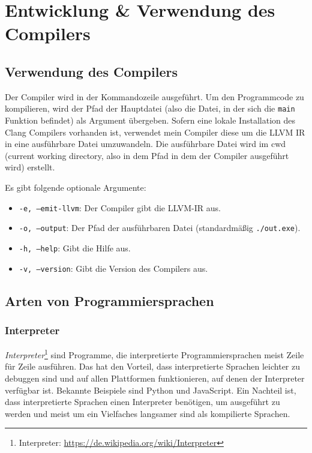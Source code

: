 \section{Entwicklung \& Verwendung des Compilers}

    \subsection{Verwendung des Compilers}
        Der Compiler wird in der Kommandozeile ausgeführt.
        Um den Programmcode zu kompilieren, wird der Pfad der Hauptdatei (also die Datei, 
        in der sich die \texttt{main} Funktion befindet) als Argument übergeben. Sofern eine lokale Installation 
        des Clang Compilers vorhanden ist, verwendet mein Compiler diese um die LLVM IR in eine ausführbare Datei umzuwandeln.
        Die ausführbare Datei wird im cwd (current working directory, also in dem Pfad in dem der Compiler ausgeführt wird) erstellt.

        \noindent Es gibt folgende optionale Argumente:
        \begin{itemize}
            \item \texttt{-e, --emit-llvm}: Der Compiler gibt die LLVM-IR aus.
            \item \texttt{-o, --output}: Der Pfad der ausführbaren Datei (standardmäßig \texttt{./out.exe}).
            \item \texttt{-h, --help}: Gibt die Hilfe aus.
            \item \texttt{-v, --version}: Gibt die Version des Compilers aus.
        \end{itemize}

    \subsection{Arten von Programmiersprachen}
        \subsubsection{Interpreter}
            \emph{Interpreter}\footnote{Interpreter: \url{https://de.wikipedia.org/wiki/Interpreter}} sind Programme, die interpretierte Programmiersprachen meist Zeile für Zeile ausführen. Das hat den Vorteil, dass interpretierte Sprachen leichter zu debuggen
            sind und auf allen Plattformen funktionieren, auf denen der Interpreter verfügbar ist. Bekannte Beispiele sind Python und JavaScript.
            Ein Nachteil ist, dass interpretierte Sprachen einen Interpreter benötigen, um ausgeführt zu werden und meist um ein Vielfaches langsamer sind als kompilierte Sprachen.    

